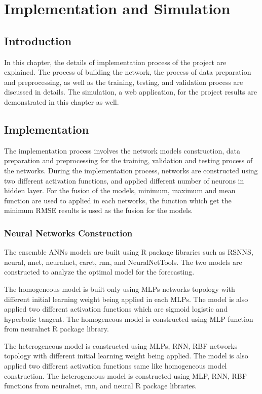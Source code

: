 \chapter {Implementation and Simulation}
\section{Introduction}
In this chapter, the details of implementation process of the project are explained. The process of building the network, the process of data preparation and preprocessing, as well as the training, testing, and validation process are discussed in details. The simulation, a web application, for the project results are demonstrated in this chapter as well.

\section{Implementation}
The implementation process involves the network models construction, data preparation and preprocessing for the training, validation and testing process of the networks. During the implementation process, networks are constructed using two different activation functions, and applied different number of neurons in hidden layer. For the fusion of the models, minimum, maximum and mean function are used to applied in each networks, the function which get the minimum RMSE results is used as the fusion for the models. 

\subsection{Neural Networks Construction}
The ensemble ANNs models are built using R package libraries such as  RSNNS, neural, nnet, neuralnet, caret, rnn, and NeuralNetTools. The two models are constructed to analyze the optimal model for the forecasting.

The homogeneous model is built only using MLPs networks topology with different initial learning weight being applied in each MLPs. The model is also applied two different activation functions which are sigmoid logistic and hyperbolic tangent. The homogeneous model is constructed using MLP function from neuralnet R package library.

The heterogeneous model is constructed using MLPs, RNN, RBF networks topology with different initial learning weight being applied. The model is also applied two different activation functions same like homogeneous model construction. The heterogeneous model is constructed using MLP, RNN, RBF functions from neuralnet, rnn, and neural R package libraries.

